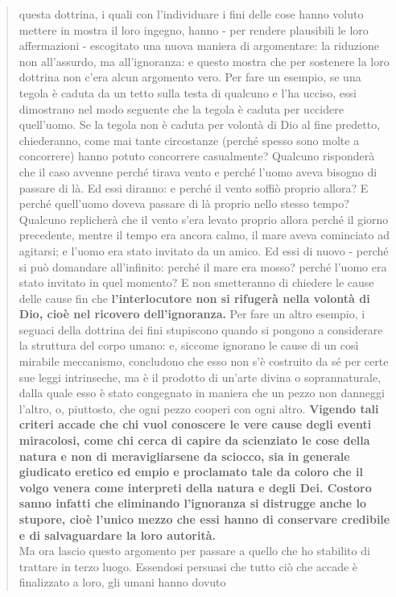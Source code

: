 \begin{quotation}
{	questa dottrina, i quali con l’individuare i fini delle cose hanno voluto mettere in mostra il
	loro ingegno, hanno - per rendere plausibili le loro affermazioni - escogitato una nuova maniera di argomentare: la riduzione non all’assurdo, ma all’ignoranza: e questo mostra
	che per sostenere la loro dottrina non c’era alcun argomento vero.} Per fare un esempio, se
	una tegola è caduta da un tetto sulla testa di qualcuno e l’ha ucciso, essi dimostrano nel
	modo seguente che la tegola è caduta per uccidere quell’uomo. Se la tegola non è caduta
	per volontà di Dio al fine predetto, chiederanno, come mai tante circostanze (perché spesso
	sono molte a concorrere) hanno potuto concorrere casualmente? Qualcuno risponderà che
	il caso avvenne perché tirava vento e perché l’uomo aveva bisogno di passare di là. Ed essi
	diranno: e perché il vento soffiò proprio allora? E perché quell’uomo doveva passare di là
	proprio nello stesso tempo? Qualcuno replicherà che il vento s’era levato proprio allora
	perché il giorno precedente, mentre il tempo era ancora calmo, il mare aveva cominciato
	ad agitarsi; e l’uomo era stato invitato da un amico. Ed essi di nuovo - perché si può domandare all’infinito: perché il mare era mosso? perché l’uomo era stato invitato in quel
	momento? E non smetteranno di chiedere le cause delle cause fin che \textbf{l’interlocutore non si
	rifugerà nella volontà di Dio, cioè nel ricovero dell’ignoranza.} Per fare un altro esempio, i
	seguaci della dottrina dei fini stupiscono quando si pongono a considerare la struttura del
	corpo umano: e, siccome ignorano le cause di un così mirabile meccanismo, concludono
	che esso non s’è costruito da sé per certe sue leggi intrinseche, ma è il prodotto di un’arte
	divina o soprannaturale, dalla quale esso è stato congegnato in maniera che un pezzo non
	danneggi l’altro, o, piuttosto, che ogni pezzo cooperi con ogni altro. \textbf{Vigendo tali criteri accade che chi vuol conoscere le vere cause degli eventi miracolosi, come chi cerca di capire
	da scienziato le cose della natura e non di meravigliarsene da sciocco, sia in generale giudicato eretico ed empio e proclamato tale da coloro che il volgo venera come interpreti della
	natura e degli Dei. Costoro sanno infatti che eliminando l’ignoranza si distrugge anche lo
	stupore, cioè l’unico mezzo che essi hanno di conservare credibile e di salvaguardare la loro
	autorità.} \\
	Ma ora lascio questo argomento per passare a quello che ho stabilito di trattare in
	terzo luogo.
	Essendosi persuasi che tutto ciò che accade è finalizzato a loro, gli umani hanno dovuto

\end{quotation}
